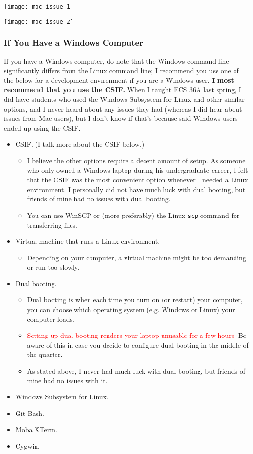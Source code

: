 \documentclass{article}
\begin{document}
\texttt{[image: mac\_issue\_1]}

\texttt{[image: mac\_issue\_2]}

\subsubsection{If You Have a Windows Computer}

If you have a Windows computer, do note that the Windows command line significantly differs from the Linux command line; I recommend you use one of the below for a development environment if you are a Windows user. \textbf{I most recommend that you use the CSIF.} When I taught ECS 36A last spring, I did have students who used the Windows Subsystem for Linux and other similar options, and I never heard about any issues they had (whereas I did hear about issues from Mac users), but I don't know if that's because said Windows users ended up using the CSIF.

\begin{itemize}[itemsep=0mm, parsep=0pt]
\item CSIF. (I talk more about the CSIF below.)
    \begin{itemize}[itemsep=0mm, parsep=0pt]
    \item I believe the other options require a decent amount of setup. As someone who only owned a Windows laptop during his undergraduate career, I felt that the CSIF was the most convenient option whenever I needed a Linux environment. I personally did not have much luck with dual booting, but friends of mine had no issues with dual booting.
    \item You can use WinSCP or (more preferably) the Linux \lstinline{scp} command for transferring files.
    \end{itemize}
\item Virtual machine that runs a Linux environment.
    \begin{itemize}[itemsep=0mm, parsep=0pt]
    \item Depending on your computer, a virtual machine might be too demanding or run too slowly.
    \end{itemize}
\item Dual booting.
    \begin{itemize}[itemsep=0mm, parsep=0pt]
    \item Dual booting is when each time you turn on (or restart) your computer, you can choose which operating system (e.g. Windows or Linux) your computer loads.
    \item \textcolor{red}{Setting up dual booting renders your laptop unusable for a few hours.} Be aware of this in case you decide to configure dual booting in the middle of the quarter.
    \item As stated above, I never had much luck with dual booting, but friends of mine had no issues with it.
    \end{itemize}
\item Windows Subsystem for Linux.
\item Git Bash.
\item Moba XTerm.
\item Cygwin.
\end{itemize}
\end{document}
